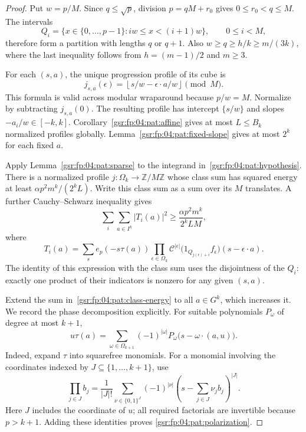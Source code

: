 \documentclass[11pt,letterpaper]{article}
\numberwithin{equation}{section}
\theoremstyle{definition}
\theoremstyle{remark}
\newcommand{\1}{\mathbf 1}
\begin{document}
\begin{proof}
Put $w=p/M$. Since $q\le\sqrt p$, division $p=qM+r_0$ gives
$0\le r_0<q\le M$. The intervals
\[
 Q_i=\{x\in\{0,\ldots,p-1\}:iw\le x<(i+1)w\},
 \qquad 0\le i<M,
\]
therefore form a partition with lengths $q$ or $q+1$. Also
$w\ge q\ge h/k\ge m/(3k)$, where the last inequality follows from
$h=(m-1)/2$ and $m\ge3$.

For each $(s,a)$, the unique progression profile of its cube is
\[
 j_{s,a}(\epsilon)
   =\left\lfloor s/w-\epsilon\cdot a/w\right\rfloor\pmod M.
\]
This formula is valid across modular wraparound because $p/w=M$.
Normalize by subtracting $j_{s,a}(0)$. The resulting profile has
intercept $\{s/w\}$ and slopes $-a_i/w\in[-k,k]$.
Corollary~\ref{gsr:fp:04:pat:affine} gives at most $L\le B_k$ normalized
profiles globally. Lemma~\ref{gsr:fp:04:pat:fixed-slope} gives at most $2^k$ for
each fixed $a$.

Apply Lemma~\ref{gsr:fp:04:pat:sparse} to the integrand
in~\eqref{gsr:fp:04:pat:hypothesis}. There is a normalized profile
$j:\Omega_k\to\mathbb Z/M\mathbb Z$ whose class sum has squared
energy at least $\alpha p^2m^k/(2^kL)$. Write this class sum as a sum
over its $M$ translates. A further Cauchy--Schwarz inequality gives
\begin{equation}\label{gsr:fp:04:pat:class-energy}
 \sum_i\sum_{a\in I^k}|T_i(a)|^2
 \ge\frac{\alpha p^2m^k}{2^kLM},
\end{equation}
where
\[
 T_i(a)=\sum_s e_p(-s\tau(a))
  \prod_{\epsilon\in\Omega_k}
   \mathcal C^{|\epsilon|}
   \bigl(1_{Q_{j(\epsilon)+i}}f_\epsilon\bigr)
       (s-\epsilon\cdot a).
\]
The identity of this expression with the class sum uses the disjointness
of the $Q_i$: exactly one product of their indicators is nonzero for
any given $(s,a)$.

Extend the sum in~\eqref{gsr:fp:04:pat:class-energy} to all $a\in G^k$,
which increases it. We record the phase decomposition explicitly.
For suitable polynomials $P_\omega$ of degree at most $k+1$,
\begin{equation}\label{gsr:fp:04:pat:polarization}
 u\tau(a)=\sum_{\omega\in\Omega_{k+1}}(-1)^{|\omega|}
 P_\omega\bigl(s-\omega\cdot(a,u)\bigr).
\end{equation}
Indeed, expand $\tau$ into squarefree monomials. For a monomial involving
the coordinates indexed by $J\subseteq\{1,\ldots,k+1\}$, use
\[
 \prod_{j\in J}b_j
  =\frac1{|J|!}\sum_{\nu\in\{0,1\}^{J}}(-1)^{|\nu|}
       \left(s-\sum_{j\in J}\nu_jb_j\right)^{|J|}.
\]
Here $J$ includes the coordinate of $u$; all required factorials are
invertible because $p>k+1$. Adding these identities proves
\eqref{gsr:fp:04:pat:polarization}.


\end{proof}
\end{document}
